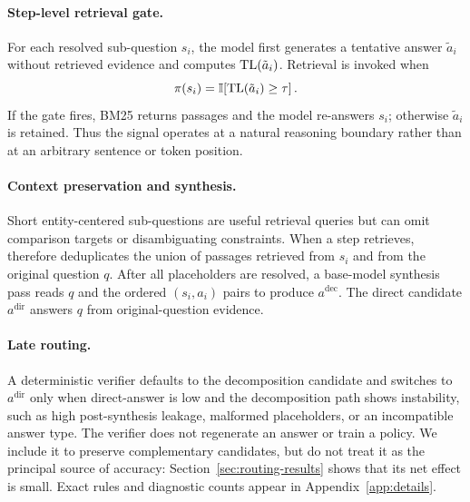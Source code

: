\paragraph{Step-level retrieval gate.}
For each resolved sub-question \(s_i\), the model first generates a tentative
answer \(\tilde a_i\) without retrieved evidence and computes
\(\mathrm{TL}(\tilde a_i)\). Retrieval is invoked when
\begin{equation}
    \pi(s_i)=\mathbb{I}\!\left[\mathrm{TL}(\tilde a_i)\geq\tau\right].
\label{eq:gate}
\end{equation}
If the gate fires, BM25 returns passages and the model re-answers \(s_i\);
otherwise \(\tilde a_i\) is retained. Thus the signal operates at a natural
reasoning boundary rather than at an arbitrary sentence or token position.

\paragraph{Context preservation and synthesis.}
Short entity-centered sub-questions are useful retrieval queries but can omit
comparison targets or disambiguating constraints. When a step retrieves,
\method{} therefore deduplicates the union of passages retrieved from \(s_i\)
and from the original question \(q\). After all placeholders are resolved, a
base-model synthesis pass reads \(q\) and the ordered \((s_i,a_i)\) pairs to
produce \(a^{\mathrm{dec}}\). The direct candidate \(a^{\mathrm{dir}}\)
answers \(q\) from original-question evidence.

\paragraph{Late routing.}
A deterministic verifier defaults to the decomposition candidate and switches
to \(a^{\mathrm{dir}}\) only when direct-answer \tailleak{} is low and the
decomposition path shows instability, such as high post-synthesis leakage,
malformed placeholders, or an incompatible answer type. The verifier does not
regenerate an answer or train a policy. We include it to preserve complementary
candidates, but do not treat it as the principal source of accuracy:
Section~\ref{sec:routing-results} shows that its net effect is small. Exact
rules and diagnostic counts appear in Appendix~\ref{app:details}.
